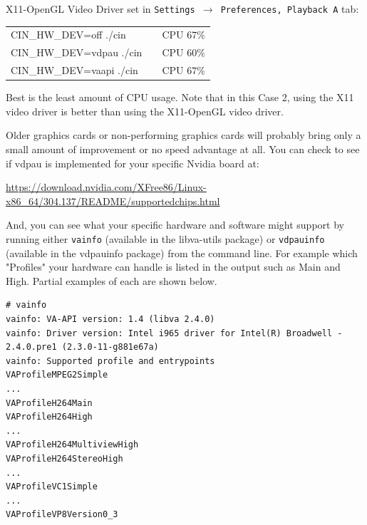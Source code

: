 \noindent X11-OpenGL Video Driver set in \texttt{Settings $\rightarrow$ Preferences, Playback A} tab:

\begin{center}
	\begin{tabular}{lcr}
		CIN\_HW\_DEV=off ./cin & &CPU $67\%$ \\
		CIN\_HW\_DEV=vdpau ./cin & &CPU $60\%$ \\
		CIN\_HW\_DEV=vaapi ./cin & &CPU $67\%$ \\
	\end{tabular}
\end{center}

\noindent Best is the least amount of CPU usage. Note that in this Case 2, using the X11 video driver is better
than using the X11-OpenGL video driver.

Older graphics cards or non-performing graphics cards will probably bring only a small amount of improvement or no speed advantage at all.  You can check to see if vdpau is implemented for your specific Nvidia board at:

{\small \url{https://download.nvidia.com/XFree86/Linux-x86_64/304.137/README/supportedchips.html}}

And, you can see what your specific hardware and software might support by running either \texttt{vainfo}
(available in the libva-utils package) or \texttt{vdpauinfo} (available in the vdpauinfo package) from the
command line.  For example which "Profiles" your hardware can handle is listed in the output such as Main
and High.  Partial examples of each are shown below.

\begin{lstlisting}[numbers=none]
# vainfo
vainfo: VA-API version: 1.4 (libva 2.4.0)
vainfo: Driver version: Intel i965 driver for Intel(R) Broadwell - 2.4.0.pre1 (2.3.0-11-g881e67a)
vainfo: Supported profile and entrypoints
VAProfileMPEG2Simple            		
...
VAProfileH264Main              
VAProfileH264High  
...
VAProfileH264MultiviewHigh 
VAProfileH264StereoHigh 
...
VAProfileVC1Simple 
...
VAProfileVP8Version0_3 
\end{lstlisting}

